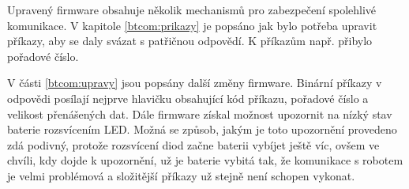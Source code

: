     Upravený firmware obsahuje několik mechanismů pro zabezpečení spolehlivé
    komunikace. V kapitole \ref{btcom:prikazy} je popsáno jak bylo potřeba
    upravit příkazy, aby se daly svázat s patřičnou odpovědí. K příkazům např.
    přibylo pořadové číslo.

    V části \ref{btcom:upravy} jsou popsány další změny firmware. Binární
    příkazy v odpovědi posílají nejprve hlavičku obsahující kód příkazu,
    pořadové číslo a velikost přenášených dat. Dále firmware získal možnost
    upozornit na nízký stav baterie rozsvícením LED. Možná se způsob, jakým je
    toto upozornění provedeno zdá podivný, protože rozsvícení diod začne
    baterii vybíjet ještě víc, ovšem ve chvíli, kdy dojde k upozornění, už je
    baterie vybitá tak, že komunikace s robotem je velmi problémová a
    složitější příkazy už stejně není schopen vykonat.
